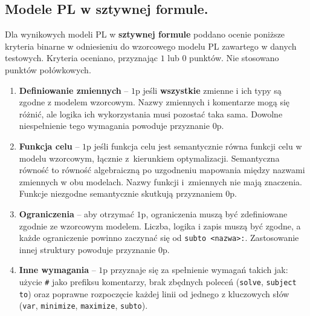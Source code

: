 


\subsection{Modele PL w sztywnej formule.}\label{ch:experiment:hardcoded}

Dla wynikowych modeli PL w \textbf{sztywnej formule} poddano ocenie poniższe kryteria binarne w odniesieniu do wzorcowego modelu PL zawartego w danych testowych. Kryteria oceniano, przyznając $1$ lub $0$ punktów. Nie stosowano punktów połówkowych.

\begin{enumerate}
\item \textbf{Definiowanie zmiennych} -- $1$p jeśli \textbf{wszystkie} zmienne i ich typy są zgodne z modelem wzorcowym. Nazwy zmiennych i komentarze mogą się różnić, ale logika ich wykorzystania musi pozostać taka sama. Dowolne niespełnienie tego wymagania powoduje przyznanie $0$p.
\item \textbf{Funkcja celu} -- $1$p jeśli funkcja celu jest semantycznie równa funkcji celu w modelu wzorcowym, łącznie z~kierunkiem optymalizacji. Semantyczna równość to równość algebraiczną po uzgodneniu mapowania między nazwami zmiennych w obu modelach. Nazwy funkcji i~zmiennych nie mają znaczenia. Funkcje niezgodne semantycznie skutkują przyznaniem $0$p.
\item \textbf{Ograniczenia} -- aby otrzymać $1$p, ograniczenia muszą być zdefiniowane zgodnie ze wzorcowym modelem. Liczba, logika i zapis muszą być zgodne, a każde ograniczenie powinno zaczynać się od \texttt{subto <nazwa>:}. Zastosowanie innej struktury powoduje przyznanie $0$p.
\item \textbf{Inne wymagania} -- $1$p przyznaje się za spełnienie wymagań takich jak: użycie \texttt{\#} jako prefiksu komentarzy, brak zbędnych poleceń (\texttt{solve}, \texttt{subject to}) oraz poprawne rozpoczęcie każdej linii od jednego z kluczowych słów (\texttt{var}, \texttt{minimize}, \texttt{maximize}, \texttt{subto}).
\end{enumerate}

